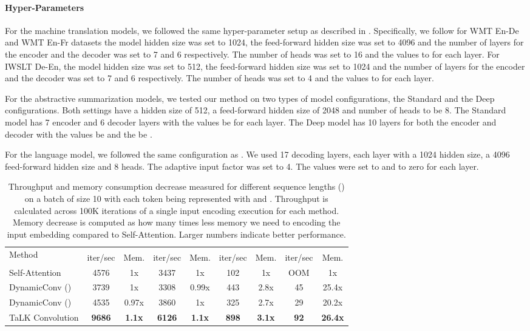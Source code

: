 \documentclass{article}
\def\talkconvfull{TaLK Convolution}
\def\iwslt{IWSLT De-En}
\def\ende{WMT En-De}
\def\enfr{WMT En-Fr}
\begin{document}
\paragraph{Hyper-Parameters} For the machine translation models, we followed the same hyper-parameter setup as described in \citet{wu2019pay}. Specifically, we follow for \ende{} and \enfr{} datasets the model hidden size  was set to 1024, the feed-forward hidden size  was set to 4096 and the number of layers for the encoder and the decoder was set to 7 and 6 respectively. The number of heads was set to 16 and the  values to  for each layer. For \iwslt{}, the model hidden size  was set to 512, the feed-forward hidden size  was set to 1024 and the number of layers for the encoder and the decoder was set to 7 and 6 respectively. The number of heads was set to 4 and the  values to  for each layer.

For the abstractive summarization models, we tested our method on two types of model configurations, the Standard and the Deep configurations. Both settings have a hidden size  of 512, a feed-forward hidden size  of 2048 and number of heads to be 8. The Standard model has 7 encoder and 6 decoder layers with the  values be  for each layer. The Deep model has 10 layers for both the encoder and decoder with the  values be  and the  be .

For the language model, we followed the same configuration as \citet{DBLP:journals/corr/abs-1809-10853}. We used 17 decoding layers, each layer with a 1024 hidden size, a 4096 feed-forward hidden size and 8 heads. The adaptive input factor was set to 4. The  values were set to  and  to zero for each layer.

\begin{table*}
\centering
\caption{Throughput and memory consumption decrease measured for different sequence lengths () on a batch of size 10 with each token being represented with  and . Throughput is calculated across 100K iterations of a single input encoding execution for each method. Memory decrease is computed as how many times less memory we need to encoding the input embedding compared to Self-Attention. Larger numbers indicate better performance.}
\vskip 0.15in
\begin{tabular}{l|cc|cc|cc|cc}
\toprule
\multirow{2}{*}{Method} & \multicolumn{2}{c|}{} & \multicolumn{2}{c|}{} & \multicolumn{2}{c|}{} & \multicolumn{2}{c}{} \\
\cline{2-9}
& iter/sec & Mem.  & iter/sec  & Mem.  & iter/sec  & Mem.  & iter/sec & Mem.  \\ \midrule
Self-Attention & 4576 & 1x & 3437 & 1x & 102 & 1x & OOM & 1x \\
DynamicConv () & 3739 & 1x & 3308 & 0.99x & 443 & 2.8x & 45 & 25.4x \\
DynamicConv () & 4535 & 0.97x & 3860 & 1x & 325 & 2.7x & 29 & 20.2x \\
\midrule
\talkconvfull{} & \textbf{9686} & \textbf{1.1x} & \textbf{6126} & \textbf{1.1x} & \textbf{898} & \textbf{3.1x} & \textbf{92} & \textbf{26.4x} \\
\bottomrule
\end{tabular}
\label{tab:time_mem_table}
\end{table*}
\end{document}
